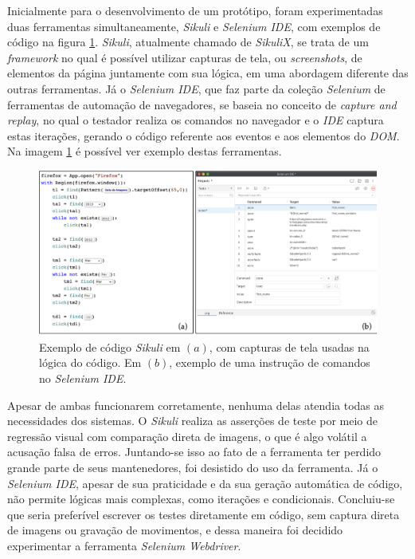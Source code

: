Inicialmente para o desenvolvimento de um protótipo, foram experimentadas duas ferramentas simultaneamente, \emph{Sikuli} e \emph{Selenium IDE}, com exemplos de código na figura \ref{fig:e2e-ferramenta}. \emph{Sikuli}, atualmente chamado de \emph{SikuliX}, se trata de um \emph{framework} no qual é possível utilizar capturas de tela, ou \emph{screenshots}, de elementos da página juntamente com sua lógica, em uma abordagem diferente das outras ferramentas. Já o \emph{Selenium IDE}, que faz parte da coleção \emph{Selenium} de ferramentas de automação de navegadores, se baseia no conceito de \emph{capture and replay}, no qual o testador realiza os comandos no navegador e o \emph{IDE} captura estas iterações, gerando o código referente aos eventos e aos elementos do \emph{DOM}. Na imagem \ref{fig:e2e-ferramenta} é possível ver exemplo destas ferramentas.

\begin{figure}[H]
    \centering
    \includegraphics[width=15cm]{source/4-solucao/images/e2e-ferramenta.png}
    \caption{Exemplo de código \emph{Sikuli} em $(a)$, com capturas de tela usadas na lógica do código. Em $(b)$, exemplo de uma instrução de comandos no \emph{Selenium IDE}.}
    \label{fig:e2e-ferramenta}
\end{figure}

Apesar de ambas funcionarem corretamente, nenhuma delas atendia todas as necessidades dos sistemas. O \emph{Sikuli} realiza as asserções de teste por meio de regressão visual com comparação direta de imagens, o que é algo volátil a acusação falsa de erros. Juntando-se isso ao fato de a ferramenta ter perdido grande parte de seus mantenedores, foi desistido do uso da ferramenta. Já o \emph{Selenium IDE}, apesar de sua praticidade e da sua geração automática de código, não permite lógicas mais complexas, como iterações e condicionais. Concluiu-se que seria preferível escrever os testes diretamente em código, sem captura direta de imagens ou gravação de movimentos, e dessa maneira foi decidido experimentar a ferramenta \emph{Selenium Webdriver}.

